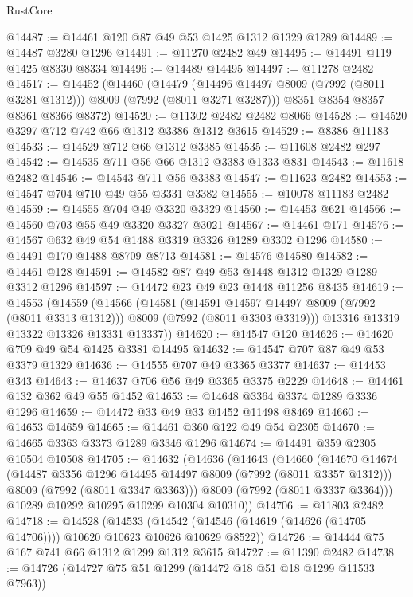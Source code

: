 \begin{lexlean}{RustCore}
\begin{coremodule}
@14487 := @14461 @120 @87 @49 @53 @1425 @1312 @1329 @1289
@14489 := @14487 @3280 @1296
@14491 := @11270 @2482 @49
@14495 := @14491 @119 @1425 @8330 @8334
@14496 := @14489 @14495
@14497 := @11278 @2482
@14517 := @14452
    (@14460
      (@14479 (@14496 @14497 @8009 (@7992 (@8011 @3281 @1312))) @8009 (@7992 (@8011 @3271 @3287)))
      @8351
      @8354
      @8357
      @8361
      @8366
      @8372)
@14520 := @11302 @2482 @2482 @8066
@14528 := @14520 @3297 @712 @742 @66 @1312 @3386 @1312 @3615
@14529 := @8386 @11183
@14533 := @14529 @712 @66 @1312 @3385
@14535 := @11608 @2482 @297
@14542 := @14535 @711 @56 @66 @1312 @3383 @1333 @831
@14543 := @11618 @2482
@14546 := @14543 @711 @56 @3383
@14547 := @11623 @2482
@14553 := @14547 @704 @710 @49 @55 @3331 @3382
@14555 := @10078 @11183 @2482
@14559 := @14555 @704 @49 @3320 @3329
@14560 := @14453 @621
@14566 := @14560 @703 @55 @49 @3320 @3327 @3021
@14567 := @14461 @171
@14576 := @14567 @632 @49 @54 @1488 @3319 @3326 @1289 @3302 @1296
@14580 := @14491 @170 @1488 @8709 @8713
@14581 := @14576 @14580
@14582 := @14461 @128
@14591 := @14582 @87 @49 @53 @1448 @1312 @1329 @1289 @3312 @1296
@14597 := @14472 @23 @49 @23 @1448 @11256 @8435
@14619 := @14553
    (@14559
      (@14566
        (@14581
          (@14591 @14597 @14497 @8009 (@7992 (@8011 @3313 @1312)))
          @8009
          (@7992 (@8011 @3303 @3319)))
        @13316
        @13319
        @13322
        @13326
        @13331
        @13337))
@14620 := @14547 @120
@14626 := @14620 @709 @49 @54 @1425 @3381 @14495
@14632 := @14547 @707 @87 @49 @53 @3379 @1329
@14636 := @14555 @707 @49 @3365 @3377
@14637 := @14453 @343
@14643 := @14637 @706 @56 @49 @3365 @3375 @2229
@14648 := @14461 @132 @362 @49 @55 @1452
@14653 := @14648 @3364 @3374 @1289 @3336 @1296
@14659 := @14472 @33 @49 @33 @1452 @11498 @8469
@14660 := @14653 @14659
@14665 := @14461 @360 @122 @49 @54 @2305
@14670 := @14665 @3363 @3373 @1289 @3346 @1296
@14674 := @14491 @359 @2305 @10504 @10508
@14705 := @14632
    (@14636
      (@14643
        (@14660
          (@14670
            @14674
            (@14487 @3356 @1296 @14495 @14497 @8009 (@7992 (@8011 @3357 @1312)))
            @8009
            (@7992 (@8011 @3347 @3363)))
          @8009
          (@7992 (@8011 @3337 @3364)))
        @10289
        @10292
        @10295
        @10299
        @10304
        @10310))
@14706 := @11803 @2482
@14718 := @14528
    (@14533 (@14542 (@14546 (@14619 (@14626 (@14705 @14706)))) @10620 @10623 @10626 @10629 @8522))
@14726 := @14444 @75 @167 @741 @66 @1312 @1299 @1312 @3615
@14727 := @11390 @2482
@14738 := @14726 (@14727 @75 @51 @1299 (@14472 @18 @51 @18 @1299 @11533 @7963))

\end{coremodule}
\end{lexlean}
